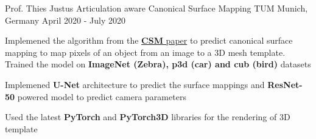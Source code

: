 \begin{cventries}
	\cventry
	{Prof. Thies Justus} %
	{Articulation aware Canonical Surface Mapping} %
	{TUM Munich, Germany} %
	{April 2020 - July 2020} %
	{
		\begin{cvitems} %
			\item {Implemened the algorithm from the
			\href{https://arxiv.org/abs/2004.00614}{\textbf{CSM} paper} to predict canonical
			surface mapping to map pixels of an object from an image to a 3D
			mesh template. Trained the model on \textbf{ImageNet (Zebra), p3d (car) and
			cub (bird)} datasets}
			\item {Implemened \textbf{U-Net} architecture to predict the surface
			mappings and \textbf{ResNet-50} powered model to predict camera parameters}
			\item {Used the latest \textbf{PyTorch} and \textbf{PyTorch3D} libraries for the rendering of 3D template}
		\end{cvitems}
	}


\end{cventries}
